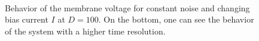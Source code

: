 \documentclass[12pt,a4paper]{article}
\begin{document}
\begin{figure}[H]
	\\	 
	\caption{Behavior of the membrane voltage for constant noise and changing bias current $I$ at $D=100$. On the bottom, one can see the behavior of the system with a higher time resolution.}
	\label{rinzelnoise} 
\end{figure}
\end{document}
